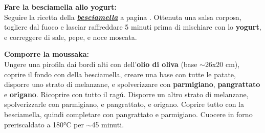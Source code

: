 \textbf{Fare la besciamella allo yogurt:} \\
Seguire la ricetta della \hyperref[sauce_bechamel]{\textbf{\textit{besciamella}}} a pagina \pageref{sauce_bechamel}.
Ottenuta una salsa corposa, togliere dal fuoco e lasciar raffreddare 5 minuti prima di mischiare con lo \textbf{yogurt}, e correggere di sale, pepe, e noce moscata. 

\textbf{Comporre la moussaka:} \\ 
Ungere una pirofila dai bordi alti con dell'\textbf{olio di oliva} (base $\sim$26x20 cm), coprire il fondo con della besciamella, creare una base con tutte le patate, disporre uno strato di melanzane, e spolverizzare con \textbf{parmigiano}, \textbf{pangrattato} e \textbf{origano}.
Ricoprire con tutto il ragú.
Disporre un altro strato di melanzane, spolverizzarle con parmigiano, e pangrattato, e origano.
Coprire tutto con la besciamella, quindi completare con pangrattato e parmigiano.
Cuocere in forno preriscaldato a 180°C per $\sim$45 minuti. 



\begin{recipeblock}
	
\end{recipeblock}
